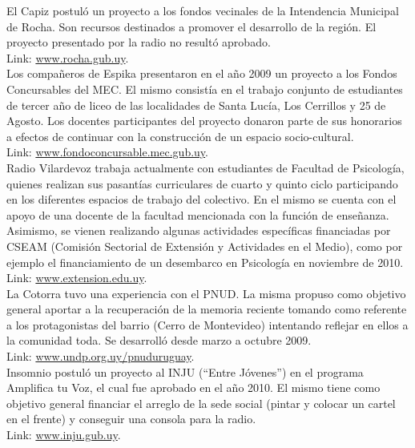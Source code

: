 El Capiz postuló un proyecto a los fondos vecinales de la Intendencia Municipal de Rocha. Son recursos destinados a promover el desarrollo de la región. El proyecto presentado por la radio no resultó aprobado.\\Link: \href{http://www.rocha.gub.uy}{www.rocha.gub.uy}.\\

Los compañeros de Espika presentaron en el año 2009 un proyecto a los Fondos Concursables del MEC. El mismo consistía en el trabajo conjunto de estudiantes de tercer año de liceo de las localidades de Santa Lucía, Los Cerrillos y 25 de Agosto. Los docentes participantes del proyecto donaron parte de sus honorarios a efectos de continuar con la construcción de un espacio socio-cultural.\\Link: \href{http://www.fondoconcursable.mec.gub.uy}{www.fondoconcursable.mec.gub.uy}.\\

Radio Vilardevoz trabaja actualmente con estudiantes de Facultad de Psicología, quienes realizan sus pasantías curriculares de cuarto y quinto ciclo participando en los diferentes espacios de trabajo del colectivo. En el mismo se cuenta con el apoyo de una docente de la facultad mencionada con la función de enseñanza. Asimismo, se vienen realizando algunas actividades específicas financiadas por CSEAM (Comisión Sectorial de Extensión y Actividades en el Medio), como por ejemplo el financiamiento de un desembarco en Psicología en noviembre de 2010.\\Link: \href{http://www.extension.edu.uy}{www.extension.edu.uy}.\\

La Cotorra tuvo una experiencia con el PNUD. La misma propuso como objetivo general aportar a la recuperación de la memoria reciente tomando como referente a los protagonistas del barrio (Cerro de Montevideo) intentando reflejar en ellos a la comunidad toda. Se desarrolló desde marzo a octubre 2009.\\Link: \href{http://www.undp.org.uy/pnuduruguay}{www.undp.org.uy/pnuduruguay}.\\

Insomnio postuló un proyecto al INJU (“Entre Jóvenes”) en el programa Amplifica tu Voz, el cual fue aprobado en el año 2010. El mismo tiene como objetivo general financiar el arreglo de la sede social (pintar y colocar un cartel en el frente) y conseguir una consola para la radio. \\Link: \href{http://www.inju.gub.uy}{www.inju.gub.uy}.\\

